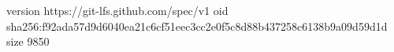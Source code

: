version https://git-lfs.github.com/spec/v1
oid sha256:f92ada57d9d6040ea21c6cf51eec3cc2e0f5c8d88b437258c6138b9a09d59d1d
size 9850
